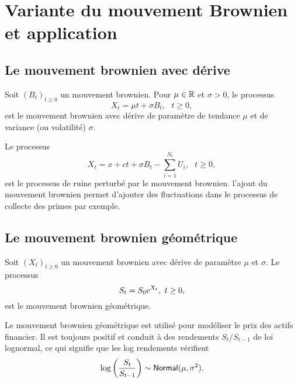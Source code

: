 \section{Variante du mouvement Brownien et application}
\subsection{Le mouvement brownien avec dérive}
\begin{definition}
Soit $(B_t)_{t\geq 0}$ un mouvement brownien. Pour $\mu\in \mathbb{R}$ et $\sigma>0$, le processus 
$$
X_t = \mu t+\sigma B_t,\text{ }t\geq0,
$$
est le mouvement brownien avec dérive de paramètre de tendance $\mu$ et de variance (ou volatilité) $\sigma$.
\end{definition}
\begin{ex}
Le processus 
$$
X_t = x+ct +\sigma B_t-\sum_{i=1}^{N_t}U_i,\text{ }t\geq 0,
$$
est le processus de ruine perturbé par le mouvement brownien. l'ajout du mouvement brownien permet d'ajouter des fluctuations dans le processus de collecte des primes par exemple. 
\end{ex}
\subsection{Le mouvement brownien géométrique}
\begin{definition}
Soit $(X_t)_{t\geq 0}$ un mouvement brownien avec dérive de paramètre $\mu$ et $\sigma$. Le processus 
$$
S_t = S_0\mathrm{e}^{X_t},\text{ }t\geq0,
$$
est le mouvement brownien géométrique.
\end{definition}
Le mouvement brownien géométrique est utilisé pour modéliser le prix des actifs financier. Il est toujours positif et conduit à des rendements $S_t/S_{t-1}$ \iid de loi lognormal, ce qui signifie que les log rendements vérifient 
$$
\log \left(\frac {S_t }{S_{t-1}}\right)\sim\mathsf{Normal}(\mu, \sigma^2).
$$ 
